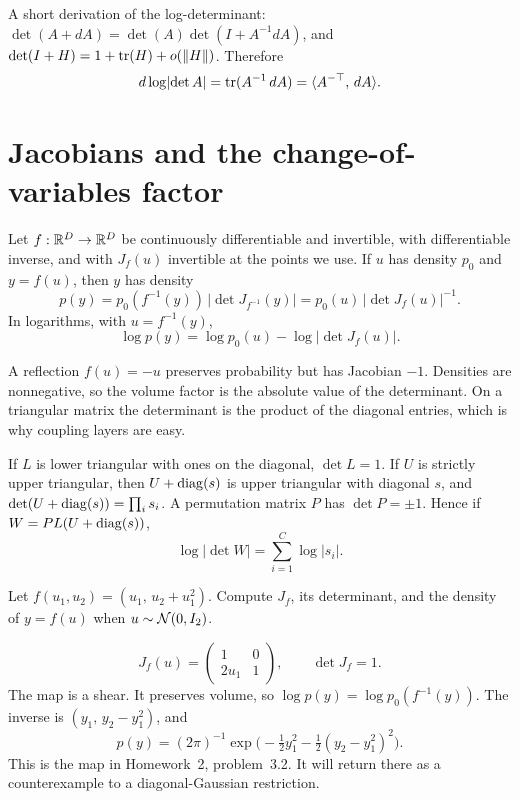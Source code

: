 A short derivation of the log-determinant: $\det(A+dA)=\det(A)\det(I+A^{-1}dA)$, and $\det(I+H)=1+\operatorname{tr}(H)+o(\|H\|)$. Therefore
\[
d\log\lvert\det A\rvert=\operatorname{tr}(A^{-1}\,dA)=\langle A^{-\top},\, dA\rangle.
\]

\section{Jacobians and the change-of-variables factor}

Let $f:\mathbb{R}^D\to\mathbb{R}^D$ be continuously differentiable and invertible, with differentiable inverse, and with $J_f(u)$ invertible at the points we use. If $u$ has density $p_0$ and $y=f(u)$, then $y$ has density
\begin{equation}
\label{eq:cov}
p(y)=p_0(f^{-1}(y))\,\lvert\det J_{f^{-1}}(y)\rvert
=p_0(u)\,\lvert\det J_f(u)\rvert^{-1}.
\end{equation}
In logarithms, with $u=f^{-1}(y)$,
\[
\log p(y)=\log p_0(u)-\log\lvert\det J_f(u)\rvert.
\]

\begin{intbox}
A reflection $f(u)=-u$ preserves probability but has Jacobian $-1$. Densities are nonnegative, so the volume factor is the absolute value of the determinant. On a triangular matrix the determinant is the product of the diagonal entries, which is why coupling layers are easy.
\end{intbox}

\begin{resultbox}
If $L$ is lower triangular with ones on the diagonal, $\det L=1$. If $U$ is strictly upper triangular, then $U+\operatorname{diag}(s)$ is upper triangular with diagonal $s$, and $\det(U+\operatorname{diag}(s))=\prod_i s_i$. A permutation matrix $P$ has $\det P=\pm 1$. Hence if $W=PL(U+\operatorname{diag}(s))$,
\[
\log\lvert\det W\rvert=\sum_{i=1}^{C}\log\lvert s_i\rvert.
\]
\end{resultbox}

\begin{practbox}
Let $f(u_1,u_2)=(u_1,\, u_2+u_1^2)$. Compute $J_f$, its determinant, and the density of $y=f(u)$ when $u\sim\mathcal{N}(0,I_2)$.
\end{practbox}
\begin{solbox}
\[
J_f(u)=\begin{pmatrix}1&0\\ 2u_1&1\end{pmatrix},\qquad \det J_f=1.
\]
The map is a shear. It preserves volume, so $\log p(y)=\log p_0(f^{-1}(y))$. The inverse is $(y_1,\, y_2-y_1^2)$, and
\[
p(y)=(2\pi)^{-1}\exp\bigl(-\tfrac12 y_1^2-\tfrac12(y_2-y_1^2)^2\bigr).
\]
This is the map in Homework~2, problem~3.2. It will return there as a counterexample to a diagonal-Gaussian restriction.
\end{solbox}
